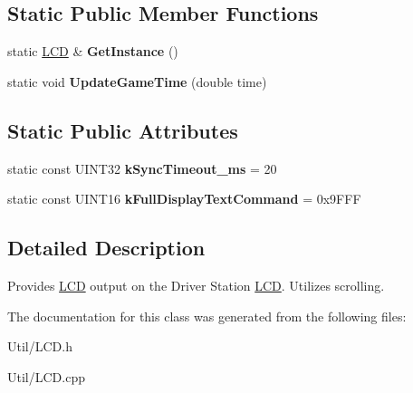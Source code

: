 \subsection*{\-Static \-Public \-Member \-Functions}
\begin{DoxyCompactItemize}
\item 
\hypertarget{class_l_c_d_a9652b3ec57faa3ba2a9f8032e0c5ce09}{
static \hyperlink{class_l_c_d}{\-L\-C\-D} \& {\bfseries \-Get\-Instance} ()}
\label{class_l_c_d_a9652b3ec57faa3ba2a9f8032e0c5ce09}

\item 
\hypertarget{class_l_c_d_ae222daaf0f64992bdc903635a20c75ae}{
static void {\bfseries \-Update\-Game\-Time} (double time)}
\label{class_l_c_d_ae222daaf0f64992bdc903635a20c75ae}

\end{DoxyCompactItemize}
\subsection*{\-Static \-Public \-Attributes}
\begin{DoxyCompactItemize}
\item 
\hypertarget{class_l_c_d_a5ab97166e7dd0ba18bddf62faefe618f}{
static const \-U\-I\-N\-T32 {\bfseries k\-Sync\-Timeout\-\_\-ms} = 20}
\label{class_l_c_d_a5ab97166e7dd0ba18bddf62faefe618f}

\item 
\hypertarget{class_l_c_d_a52ba7ce67df98f2b8fb45995639d0f14}{
static const \-U\-I\-N\-T16 {\bfseries k\-Full\-Display\-Text\-Command} = 0x9\-F\-F\-F}
\label{class_l_c_d_a52ba7ce67df98f2b8fb45995639d0f14}

\end{DoxyCompactItemize}


\subsection{\-Detailed \-Description}
\-Provides \hyperlink{class_l_c_d}{\-L\-C\-D} output on the \-Driver \-Station \hyperlink{class_l_c_d}{\-L\-C\-D}. \-Utilizes scrolling. 

\-The documentation for this class was generated from the following files\-:\begin{DoxyCompactItemize}
\item 
\-Util/\-L\-C\-D.\-h\item 
\-Util/\-L\-C\-D.\-cpp\end{DoxyCompactItemize}
